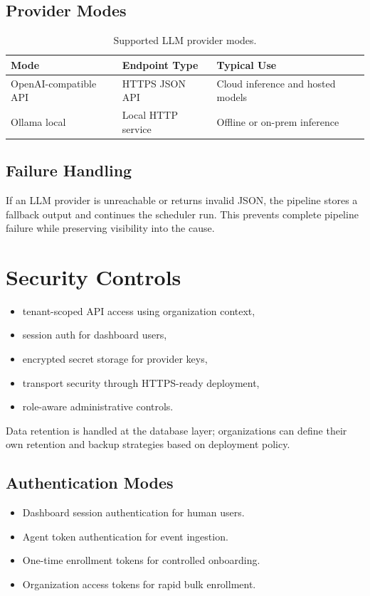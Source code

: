 \documentclass[conference]{IEEEtran}
\begin{document}
\subsection{Provider Modes}
\begin{table}[!t]
\centering
\begin{tabular}{>{\raggedright\arraybackslash}p{} >{\raggedright\arraybackslash}p{} >{\raggedright\arraybackslash}p{}}
\toprule
\textbf{Mode} & \textbf{Endpoint Type} & \textbf{Typical Use} \\
\midrule
OpenAI-compatible API & HTTPS JSON API & Cloud inference and hosted models \\
Ollama local & Local HTTP service & Offline or on-prem inference \\
\bottomrule
\end{tabular}
\caption{Supported LLM provider modes.}
\label{tab:llm-modes}
\end{table}

\subsection{Failure Handling}
If an LLM provider is unreachable or returns invalid JSON, the pipeline stores a fallback output and continues the scheduler run. This prevents complete pipeline failure while preserving visibility into the cause.
\FloatBarrier

\section{Security Controls}
\begin{itemize}[leftmargin=1.2em]
    \item tenant-scoped API access using organization context,
    \item session auth for dashboard users,
    \item encrypted secret storage for provider keys,
    \item transport security through HTTPS-ready deployment,
    \item role-aware administrative controls.
\end{itemize}
Data retention is handled at the database layer; organizations can define their own retention and backup strategies based on deployment policy.
\subsection{Authentication Modes}
\begin{itemize}[leftmargin=1.2em]
    \item Dashboard session authentication for human users.
    \item Agent token authentication for event ingestion.
    \item One-time enrollment tokens for controlled onboarding.
    \item Organization access tokens for rapid bulk enrollment.
\end{itemize}
\end{document}

